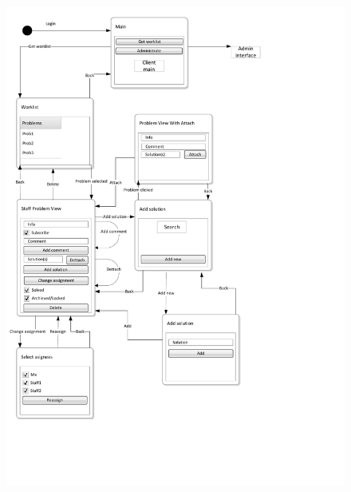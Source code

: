 \begin{figure}[hb]
	\centering
		\includegraphics[width = \textwidth, clip=true, trim=0 4cm 5cm 0]{input/application_domain_analysis/Navigation_DiagramStaff.pdf}
	\morscaption{\sinterface[c]}
	\label{fig:Navigation_DiagramAdmin}
\end{figure}



